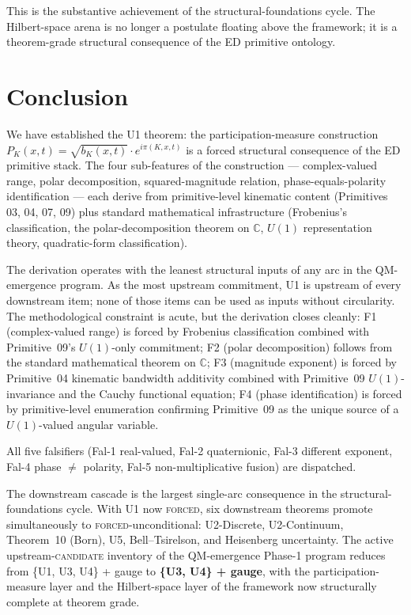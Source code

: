 \documentclass[11pt,a4paper]{article}
\begin{document}
This is the substantive achievement of the structural-foundations cycle. The Hilbert-space arena is no longer a postulate floating above the framework; it is a theorem-grade structural consequence of the ED primitive ontology.

\section{Conclusion}\label{sec:conclusion}

We have established the U1 theorem: the participation-measure construction $P_K(x, t) = \sqrt{b_K(x, t)} \cdot e^{i \pi(K, x, t)}$ is a forced structural consequence of the ED primitive stack. The four sub-features of the construction --- complex-valued range, polar decomposition, squared-magnitude relation, phase-equals-polarity identification --- each derive from primitive-level kinematic content (Primitives 03, 04, 07, 09) plus standard mathematical infrastructure (Frobenius's classification, the polar-decomposition theorem on $\mathbb{C}$, $U(1)$ representation theory, quadratic-form classification).

The derivation operates with the leanest structural inputs of any arc in the QM-emergence program. As the most upstream commitment, U1 is upstream of every downstream item; none of those items can be used as inputs without circularity. The methodological constraint is acute, but the derivation closes cleanly: F1 (complex-valued range) is forced by Frobenius classification combined with Primitive~09's $U(1)$-only commitment; F2 (polar decomposition) follows from the standard mathematical theorem on $\mathbb{C}$; F3 (magnitude exponent) is forced by Primitive~04 kinematic bandwidth additivity combined with Primitive~09 $U(1)$-invariance and the Cauchy functional equation; F4 (phase identification) is forced by primitive-level enumeration confirming Primitive~09 as the unique source of a $U(1)$-valued angular variable.

All five falsifiers (Fal-1 real-valued, Fal-2 quaternionic, Fal-3 different exponent, Fal-4 phase $\neq$ polarity, Fal-5 non-multiplicative fusion) are dispatched.

The downstream cascade is the largest single-arc consequence in the structural-foundations cycle. With U1 now \textsc{forced}, six downstream theorems promote simultaneously to \textsc{forced}-unconditional: U2-Discrete, U2-Continuum, Theorem~10 (Born), U5, Bell--Tsirelson, and Heisenberg uncertainty. The active upstream-\textsc{candidate} inventory of the QM-emergence Phase-1 program reduces from \{U1, U3, U4\} + gauge to \textbf{\{U3, U4\} + gauge}, with the participation-measure layer and the Hilbert-space layer of the framework now structurally complete at theorem grade.
\end{document}
